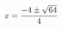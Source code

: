 \documentclass[preview]{standalone}
\begin{document}
\begin{align*}
\special{dvisvgm:raw <g id='unique000'>}x=\frac{-4\pm\sqrt{64}}{4}\special{dvisvgm:raw </g>}
\end{align*}
\end{document}
